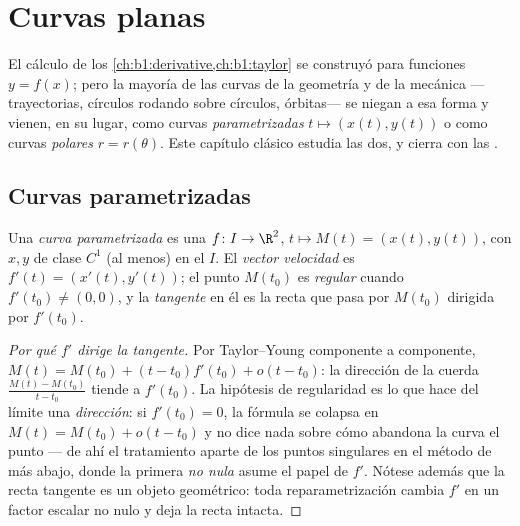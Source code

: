 \chapter{Curvas planas}\label{ch:b1:curves}

El cálculo de los \cref{ch:b1:derivative,ch:b1:taylor} se construyó
para funciones $y = f(x)$; pero la mayoría de las curvas de la
geometría y de la mecánica ---trayectorias, círculos rodando sobre
círculos, órbitas--- se niegan a esa forma y vienen, en su lugar,
como curvas \emph{parametrizadas} $t \mapsto (x(t), y(t))$ o como
curvas \emph{polares} $r = r(\theta)$. Este capítulo clásico estudia
las dos, y cierra con las .

\section{Curvas parametrizadas}

\begin{definition}\label{def:b1:curves:def}
Una \emph{curva parametrizada} es una
 $f \colon I \to \R^2$, $t \mapsto M(t) = (x(t), y(t))$,
con $x, y$ de clase $C^1$ (al menos) en el  $I$. El
\emph{vector velocidad} es $f'(t) = (x'(t), y'(t))$; el punto
$M(t_0)$ es \emph{regular} cuando $f'(t_0) \neq (0,0)$, y la
\emph{tangente} en él es la recta que pasa por $M(t_0)$ dirigida por
$f'(t_0)$.
\end{definition}

\begin{proof}[Por qué $f'$ dirige la tangente]
Por Taylor--Young componente a componente,
$M(t) = M(t_0) + (t - t_0) f'(t_0) + o(t - t_0)$: la dirección de la
cuerda $\frac{M(t) - M(t_0)}{t - t_0}$ tiende a $f'(t_0)$. La
hipótesis de regularidad es lo que hace del límite una
\emph{dirección}: si $f'(t_0) = 0$, la fórmula se colapsa en
$M(t) = M(t_0) + o(t - t_0)$ y no dice nada sobre cómo abandona la
curva el punto --- de ahí el tratamiento aparte de los puntos
singulares en el método de más abajo, donde la primera 
\emph{no nula} asume el papel de $f'$. Nótese además que la recta
tangente es un objeto geométrico: toda reparametrización cambia $f'$
en un factor escalar no nulo y deja la recta intacta.
\end{proof}

